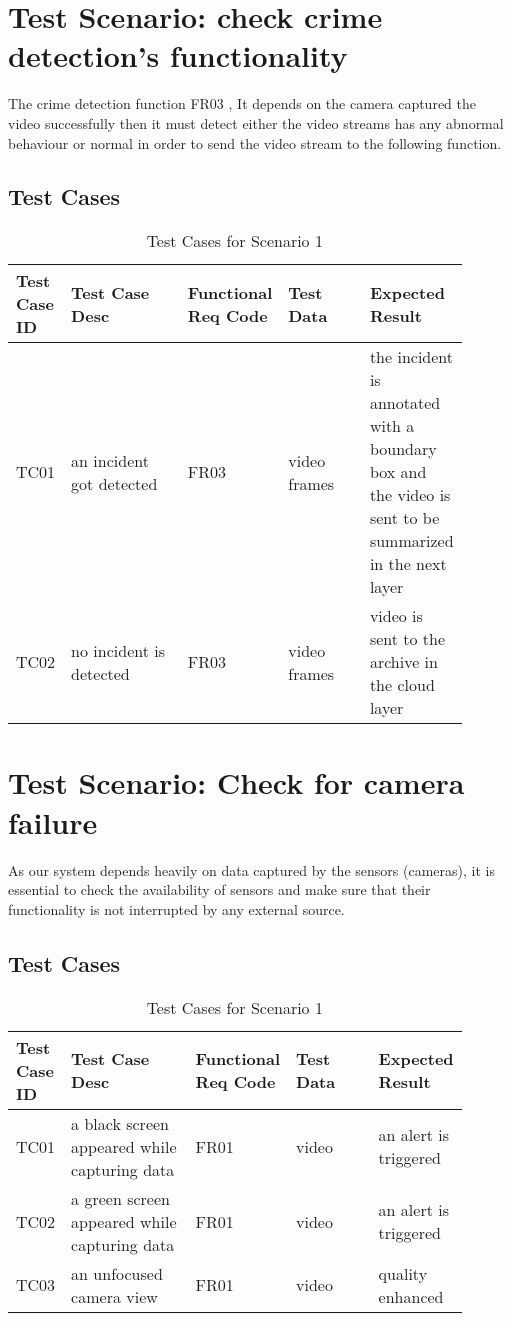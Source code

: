 \documentclass[12pt]{article}
\begin{document}
\section{Test Scenario: check crime detection's functionality}\label{sec:TSx}

The crime detection function FR03 , It depends on the camera captured the video successfully then it must detect either the video streams has any abnormal behaviour or normal in order to send the video stream to the following function.  
\subsection{Test Cases}
\begin{table}[h]
\caption{Test Cases for Scenario 1}
\label{tab:TC1}
\begin{tabular}{|p{0.1\linewidth}|p{0.3\linewidth}|p{0.1\linewidth}|p{0.2\linewidth}|p{0.2\linewidth}|}
\hline
Test Case ID & Test Case Desc & Functional Req Code & Test Data & Expected Result \\ \hline
TC01  & an incident got detected & FR03 &  video frames  & the incident is annotated with a boundary box and the video is sent to be summarized in the next layer           \\ \hline
TC02 & no incident is detected   & FR03    &  video frames     & video is sent to the archive in the cloud layer           \\ \hline

\end{tabular}
\end{table}
\newpage
\section{Test Scenario: Check for camera failure}\label{sec:TSy}
As our system depends heavily on data captured by the sensors (cameras), it is essential to check the availability of sensors and make sure that their functionality is not interrupted by any external source.

\subsection{Test Cases}
\begin{table}[h]
\caption{Test Cases for Scenario 1}
\label{tab:TC1}
\begin{tabular}{|p{0.1\linewidth}|p{0.3\linewidth}|p{0.1\linewidth}|p{0.2\linewidth}|p{0.2\linewidth}|}
\hline
Test Case ID & Test Case Desc & Functional Req Code & Test Data & Expected Result \\ \hline
TC01  & a black screen appeared while capturing data & FR01 &  video   &  an alert is triggered                \\ \hline
TC02 & a green screen appeared while capturing data   & FR01    &  video      &  an alert is triggered           \\ \hline
TC03 & an unfocused camera view  & FR01    &  video      &  quality enhanced          \\ \hline

\end{tabular}
\end{table}
\end{document}

